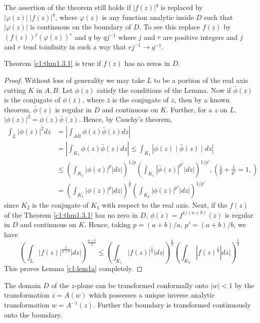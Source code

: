 \begin{remark*}
The assertion of the theorem still holds if $|f(z)|^q$ is replaced by $|\varphi (z) | \; | f(z)|^q$, where $\varphi (z)$ is any function analytic inside $D$ such that $|\varphi(z)|$ is continuous on the boundary of $D$. To see this replace $f(z)$ by $(f(z))^j (\varphi(z))^r$ and $q$ by $q j^{-1}$ where $j$ and $r$ are positive integers and $j$ and $r$ tend to\pageoriginale infinity in such a way that $rj^{-1} \to q^{-1}$.
\end{remark*}

\setcounter{lem}{0}
\begin{lem}\label{c1:lem1a}
Theorem \ref{c1:thm1.3.1} is true if $f(z)$ has no zeros in $D$.
\end{lem}

\begin{proof}
Without loss of generality we may take $L$ to be a portion of the real axis cutting $K$ in $A,B$. Let $\phi (z)$ satisfy the conditions of the Lemma. Now if $\bar{\phi}(z)$ is the conjugate of $\phi(\bar{z})$, where $\bar{z}$ is the conjugate of $z$, then by a known theorem, $\bar{\phi}(z)$ is regular in $D$ and continuous on $K$. Further, for a $z$ on $L$, $|\phi (z)|^2 = \phi(z) \bar{\phi}(z)$. Hence, by Cauchy's theorem,
\begin{align*}
\int_L |\phi(z)|^2 dz & = \left|\int_{AB} \phi(z) \bar{\phi}(z) dz\right|\\
& = |\int_{K_1} \phi (z) \bar{\phi} (z) dz| \leq \int_{K_1} |\phi(z)\mid \bar{\phi}(z) \mid dz|\\
& \leq \left( \int_{K_1} |\phi(z)|^p|dz|\right)^{1/p} \left( \int_{K_1} |\bar{\phi}(z)|^{p'} |dz|\right)^{1/p'}, \left(\frac{1}{p} + \frac{1}{p'} =1,  \right)\\
& = \left(\int_{K_1} |\phi(z)|^p |dz|\right)^{\frac{1}{p}} \left(\int_{K_2} |\phi(z)|^{p'}|dz|\right)^{1/p'}
\end{align*}
since $K_2$ is the conjugate of $K_1$ with respect to the real axis. Next, if the $f(z)$ of the Theorem \ref{c1:thm1.3.1} has no zero in $D$, $\phi(z) = f^{1/(a+b)} (z)$ is regular in $D$ and continuous on $K$. Hence, taking $p = (a+b) / a$, $p' = (a+b)/b$, we have 
$$
\left(\int_L |f(z)|^{\frac{2}{a+b}} |dz| \right)^{\frac{a+b}{2}} \leq \left(\int_{K_1} |f(z)|^{\frac{1}{a}} |dz| \right)^{\frac{a}{2}} \left( \int_{K_2} |f(z)^{\frac{1}{b}}| dz|\right)^{\frac{b}{2}}
$$
This proves Lemma \ref{c1:lem1a} completely.
\end{proof}

\begin{lem}\label{c1:lem2a}
The domain $D$ of the $z$-plane can be transformed conformally onto $|w| < 1$ by the transformation $z = A(w)$ which possesses a unique inverse analytic transformation $w = A^{-1}(z)$. Further the boundary is transformed continuously onto the boundary.
\end{lem}

